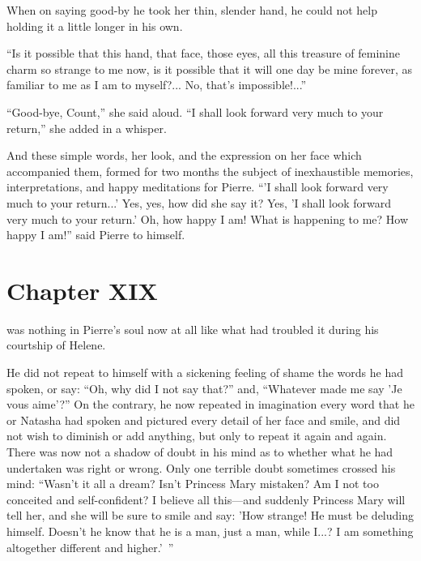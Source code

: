 When on saying good-by he took her thin, slender hand, he could
not help holding it a little longer in his own.

``Is it possible that this hand, that face, those eyes, all this
treasure of feminine charm so strange to me now, is it possible
that it will one day be mine forever, as familiar to me as I am
to myself?... No, that's impossible!...''

``Good-bye, Count,'' she said aloud. ``I shall look forward very
much to your return,'' she added in a whisper.

And these simple words, her look, and the expression on her face
which accompanied them, formed for two months the subject of
inexhaustible memories, interpretations, and happy meditations
for Pierre. ``'I shall look forward very much to your return...'
Yes, yes, how did she say it?  Yes, 'I shall look forward very
much to your return.' Oh, how happy I am! What is happening to
me? How happy I am!'' said Pierre to himself.


\chapter*{Chapter XIX}
\ifaudio 
{}
\fi

 was nothing in Pierre's soul now at all like what had
troubled it during his courtship of Helene.

He did not repeat to himself with a sickening feeling of shame
the words he had spoken, or say: ``Oh, why did I not say that?''
and, ``Whatever made me say 'Je vous aime'?'' On the contrary, he
now repeated in imagination every word that he or Natasha had
spoken and pictured every detail of her face and smile, and did
not wish to diminish or add anything, but only to repeat it again
and again. There was now not a shadow of doubt in his mind as to
whether what he had undertaken was right or wrong.  Only one
terrible doubt sometimes crossed his mind: ``Wasn't it all a
dream? Isn't Princess Mary mistaken? Am I not too conceited and
self-confident? I believe all this---and suddenly Princess Mary
will tell her, and she will be sure to smile and say: 'How
strange! He must be deluding himself. Doesn't he know that he is
a man, just a man, while I...? I am something altogether
different and higher.'\ ''

